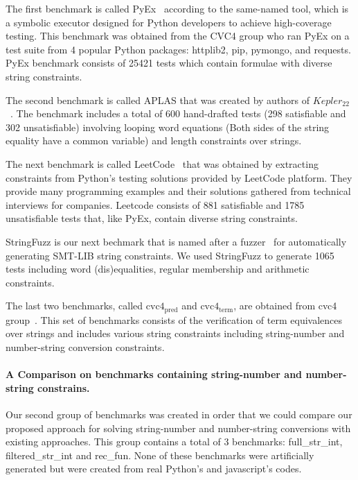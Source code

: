 The first benchmark is called PyEx~\cite{pyex} according to the same-named tool, which is a symbolic executor designed for Python developers to achieve high-coverage testing. This benchmark was obtained from the CVC4 group who ran PyEx on a test suite from 4 popular Python packages: httplib2, pip, pymongo, and requests. PyEx benchmark consists of 25421 tests which contain formulae with diverse string constraints.

The second benchmark is called APLAS that was created by authors of \textsf{$Kepler_{22}$}~\cite{aplas}. The benchmark includes a total of 600 hand-drafted tests (298 satisfiable and 302 unsatisfiable) involving looping word equations (Both sides of the string equality have a common variable) and length constraints over strings. 

The next benchmark is called LeetCode~\cite{LeetCode} that was obtained by extracting constraints from Python's testing solutions provided by LeetCode platform. They provide many programming examples and their solutions gathered from technical interviews for companies. Leetcode consists of 881 satisfiable and 1785 unsatisfiable tests that, like PyEx, contain diverse string constraints.

StringFuzz is our next bechmark that is named after a fuzzer~\cite{StringFuzz} for automatically generating SMT-LIB string constraints. We used StringFuzz to generate 1065 tests including word (dis)equalities, regular membership and arithmetic constraints. 

The last two benchmarks, called $\text{cvc4}_{\text{pred}}$ and $\text{cvc4}_{\text{term}}$, are obtained from cvc4 group~\cite{termEQ}. This set of benchmarks consists of the verification of term equivalences over strings and includes various string constraints including string-number and number-string conversion constraints.


\paragraph{A Comparison on benchmarks containing string-number and number-string constrains.}
Our second group of benchmarks was created in order that we could compare our proposed approach for solving string-number and number-string conversions with existing approaches. This group contains a total of 3 benchmarks: full\_str\_int, filtered\_str\_int and rec\_fun. None of these benchmarks were artificially generated but were created from real Python's and javascript's codes.

